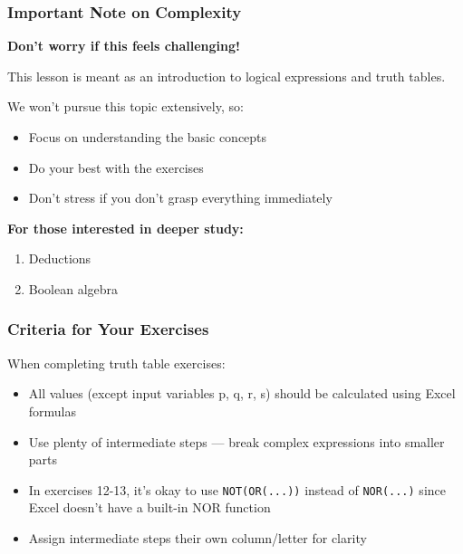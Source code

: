 \documentclass{beamer}
\begin{document}
\begin{frame}
\frametitle{Important Note on Complexity}
\textbf{Don't worry if this feels challenging!}\pause

This lesson is meant as an \alert{introduction} to logical expressions and truth tables.\pause

\vspace{0.3cm}
We won't pursue this topic extensively, so:\pause
\begin{itemize}
    \item Focus on understanding the basic concepts\pause
    \item Do your best with the exercises\pause
    \item Don't stress if you don't grasp everything immediately
\end{itemize}\pause

\vspace{0.3cm}
\textbf{For those interested in deeper study:}
\begin{enumerate}
    \item Deductions\pause
    \item Boolean algebra
\end{enumerate}
\end{frame}

\begin{frame}
\frametitle{Criteria for Your Exercises}
When completing truth table exercises:\pause

\begin{itemize}
    \item All values (except input variables p, q, r, s) should be \alert{calculated using Excel formulas}\pause
    \item Use plenty of \alert{intermediate steps} --- break complex expressions into smaller parts\pause
    \item In exercises 12-13, it's okay to use \texttt{NOT(OR(...))} instead of \texttt{NOR(...)} since Excel doesn't have a built-in NOR function\pause
    \item Assign intermediate steps their own column/letter for clarity
\end{itemize}
\end{frame}
\end{document}
